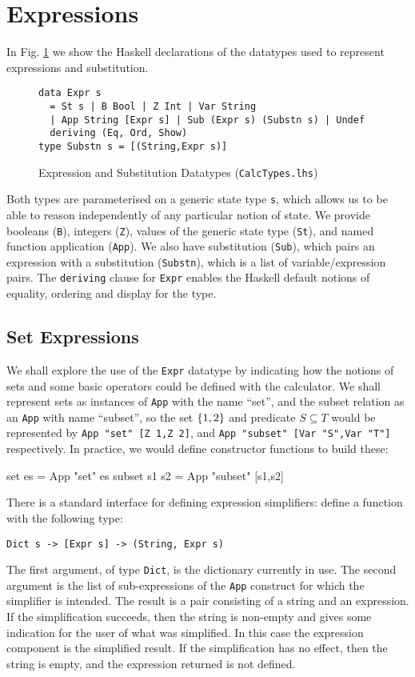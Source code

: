 \section{Expressions}\label{sec:Expressions}

In Fig. \ref{fig:expr-types} we show the Haskell declarations
of the datatypes used to represent expressions and substitution.
\begin{figure}[tb]
\begin{verbatim}
data Expr s
  = St s | B Bool | Z Int | Var String
  | App String [Expr s] | Sub (Expr s) (Substn s) | Undef
  deriving (Eq, Ord, Show)
type Substn s = [(String,Expr s)]
\end{verbatim}
  \caption{Expression and Substitution Datatypes (\texttt{CalcTypes.lhs})}
  \label{fig:expr-types}
\end{figure}
Both types are parameterised on a generic state type \texttt{s},
which allows us to be able to reason independently
of any particular notion of state.
We provide booleans (\texttt{B}),
integers (\texttt{Z}),
values of the generic state type (\texttt{St}),
and named function application (\texttt{App}).
We also have substitution (\texttt{Sub}), which pairs an expression
with a substitution (\texttt{Substn}),
which is a list of variable/expression pairs.
The \texttt{deriving} clause for \texttt{Expr}
enables the Haskell default notions
of equality, ordering and display for the type.

\subsection{Set Expressions}

We shall explore the use of the \texttt{Expr}  datatype
by indicating how the notions of sets and some basic operators
could be defined with the calculator.
We shall represent sets as instances of \texttt{App} with the name ``set'',
and the subset relation as an \texttt{App} with name ``subset'',
so the set $\{{1,2}\}$  and predicate $S \subseteq T$
would be represented by
\verb$App "set" [Z 1,Z 2]$,
and
\verb$App "subset" [Var "S",Var "T"]$ respectively.
In practice, we would define constructor functions to build
these:
\begin{code}
set es = App "set" es
subset s1 s2 = App "subset" [s1,s2]
\end{code}
There is a standard interface for defining expression simplifiers:
define a function with the following type:
\begin{verbatim}
Dict s -> [Expr s] -> (String, Expr s)
\end{verbatim}
The first argument, of type \texttt{Dict},
is the dictionary currently in use.
The second argument is the list of sub-expressions of
the \texttt{App} construct for which the simplifier is intended.
The result is a pair consisting of a string and an expression.
If the simplification succeeds, then the string is non-empty
and gives some indication for the user
of what was simplified.
In this case the expression component is the simplified result.
If the simplification has no effect, then the string is empty,
and the expression returned is not defined.

